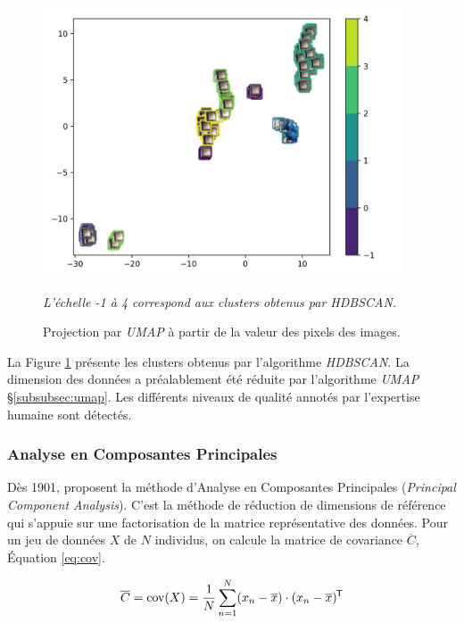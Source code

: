 \begin{figure}[hbtp]
	\centering
	\includegraphics[width=0.95\textwidth,height=\textheight,keepaspectratio]{../Chap4/Figures/visualize_HDBSCAN_clusters_pixel_space.png}
	\caption{Projection par \textit{UMAP} à partir de la valeur des pixels des images.}
	\textit{L'échelle -1 à 4 correspond aux clusters obtenus par \textit{HDBSCAN}.}
	\label{fig:hdbscan}
\end{figure}

La Figure \ref{fig:hdbscan} présente les clusters obtenus par l'algorithme \textit{HDBSCAN}.
La dimension des données a préalablement été réduite par l'algorithme \textit{UMAP} §\ref{subsubsec:umap}.
Les différents niveaux de qualité annotés par l'expertise humaine sont détectés.

\subsubsection{Analyse en Composantes Principales} \label{subsubsec:ACP}
Dès 1901, \citeauthor{pearson_lines_1901, hotelling_analysis_1933} \cite{pearson_lines_1901, hotelling_analysis_1933} proposent la méthode d'Analyse en Composantes Principales (\textit{Principal Component Analysis}).
C'est la méthode de réduction de dimensions de référence qui s'appuie sur une factorisation de la matrice représentative des données.
Pour un jeu de données $X$ de $N$ individus, on calcule la matrice de covariance $\overline{C}$, Équation \ref{eq:cov}.

\begin{equation} \label{eq:cov}
\overline{C} = \operatorname{cov}(X)=\frac{1}{N} \sum_{n=1}^{N}(x_n-\overline{x}) \cdot (x_n-\overline{x})^{\mkern-1.5mu\mathsf{T}}
\end{equation}

